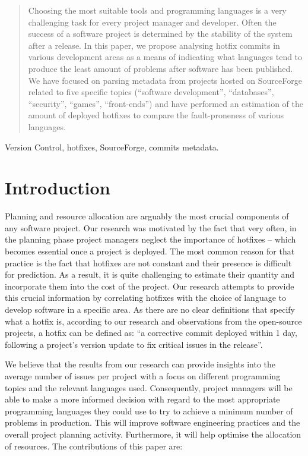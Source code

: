 \maketitle

\begin{abstract}
Choosing the most suitable tools and programming languages is a very challenging task for every project manager and developer. Often the success of a software project is determined by the stability of the system after a release. In this paper, we propose analysing hotfix commits in various development areas as a means of indicating what languages tend to produce the least amount of problems after software has been published. We have focused on parsing metadata from projects hosted on SourceForge related to five specific topics (“software development”, “databases”, “security”, “games”, “front-ends”) and have performed an estimation of the amount of deployed hotfixes to compare the fault-proneness of various languages. 
\end{abstract}

\begin{IEEEkeywords}
Version Control, hotfixes, SourceForge, commits metadata.
\end{IEEEkeywords}

\section{Introduction}
Planning and resource allocation are arguably the most crucial components of any software project. Our research was motivated by the fact that very often, in the planning phase project managers neglect the importance of hotfixes – which becomes essential once a project is deployed. The most common reason for that practice is the fact that hotfixes are not constant and their presence is difficult for prediction. As a result, it is quite challenging to estimate their quantity and incorporate them into the cost of the project.  Our research attempts to provide this crucial information by correlating hotfixes with the choice of language to develop software in a specific area. As there are no clear definitions that specify what a hotfix is, according to our research and observations from the open-source projects, a hotfix can be defined as: “a corrective commit deployed within 1 day, following a project’s version update to fix critical issues in the release”.\par
We believe that the results from our research can provide insights into the average number of issues per project with a focus on different programming topics and the relevant languages used. Consequently, project managers will be able to make a more informed decision with regard to the most appropriate programming languages they could use to try to achieve a minimum number of problems in production. This will improve software engineering practices and the overall project planning activity. Furthermore, it will help optimise the allocation of resources.
The contributions of this paper are:

